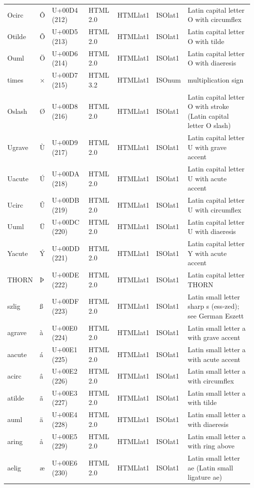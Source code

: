 \documentclass{article}
\begin{document}
\begin{tabular}{lllllll}
Ocirc & Ô & U+00D4 (212) & HTML 2.0 & HTMLlat1 & ISOlat1 & Latin capital letter O with circumflex \\
Otilde & Õ & U+00D5 (213) & HTML 2.0 & HTMLlat1 & ISOlat1 & Latin capital letter O with tilde \\
Ouml & Ö & U+00D6 (214) & HTML 2.0 & HTMLlat1 & ISOlat1 & Latin capital letter O with diaeresis \\
times & × & U+00D7 (215) & HTML 3.2 & HTMLlat1 & ISOnum & multiplication sign \\
Oslash & Ø & U+00D8 (216) & HTML 2.0 & HTMLlat1 & ISOlat1 & Latin capital letter O with stroke (Latin capital letter O slash) \\
Ugrave & Ù & U+00D9 (217) & HTML 2.0 & HTMLlat1 & ISOlat1 & Latin capital letter U with grave accent \\
Uacute & Ú & U+00DA (218) & HTML 2.0 & HTMLlat1 & ISOlat1 & Latin capital letter U with acute accent \\
Ucirc & Û & U+00DB (219) & HTML 2.0 & HTMLlat1 & ISOlat1 & Latin capital letter U with circumflex \\
Uuml & Ü & U+00DC (220) & HTML 2.0 & HTMLlat1 & ISOlat1 & Latin capital letter U with diaeresis \\
Yacute & Ý & U+00DD (221) & HTML 2.0 & HTMLlat1 & ISOlat1 & Latin capital letter Y with acute accent \\
THORN & Þ & U+00DE (222) & HTML 2.0 & HTMLlat1 & ISOlat1 & Latin capital letter THORN \\
szlig & ß & U+00DF (223) & HTML 2.0 & HTMLlat1 & ISOlat1 & Latin small letter sharp s (ess-zed); see German Eszett \\
agrave & à & U+00E0 (224) & HTML 2.0 & HTMLlat1 & ISOlat1 & Latin small letter a with grave accent \\
aacute & á & U+00E1 (225) & HTML 2.0 & HTMLlat1 & ISOlat1 & Latin small letter a with acute accent \\
acirc & â & U+00E2 (226) & HTML 2.0 & HTMLlat1 & ISOlat1 & Latin small letter a with circumflex \\
atilde & ã & U+00E3 (227) & HTML 2.0 & HTMLlat1 & ISOlat1 & Latin small letter a with tilde \\
auml & ä & U+00E4 (228) & HTML 2.0 & HTMLlat1 & ISOlat1 & Latin small letter a with diaeresis \\
aring & å & U+00E5 (229) & HTML 2.0 & HTMLlat1 & ISOlat1 & Latin small letter a with ring above \\
aelig & æ & U+00E6 (230) & HTML 2.0 & HTMLlat1 & ISOlat1 & Latin small letter ae (Latin small ligature ae) \\

\end{tabular}
\end{document}
